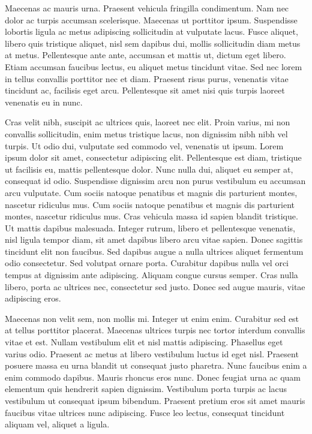 \documentclass[botnum,fleqn,final]{unmeethesis}
\begin{document}
Maecenas ac mauris urna. Praesent vehicula fringilla condimentum. Nam nec dolor
ac turpis accumsan scelerisque. Maecenas ut porttitor ipsum. Suspendisse
lobortis ligula ac metus adipiscing sollicitudin at vulputate lacus. Fusce
aliquet, libero quis tristique aliquet, nisl sem dapibus dui, mollis
sollicitudin diam metus at metus. Pellentesque ante ante, accumsan et mattis
ut, dictum eget libero. Etiam accumsan faucibus lectus, eu aliquet metus
tincidunt vitae. Sed nec lorem in tellus convallis porttitor nec et diam.
Praesent risus purus, venenatis vitae tincidunt ac, facilisis eget arcu.
Pellentesque sit amet nisi quis turpis laoreet venenatis eu in nunc.

Cras velit nibh, suscipit ac ultrices quis, laoreet nec elit. Proin varius, mi
non convallis sollicitudin, enim metus tristique lacus, non dignissim nibh nibh
vel turpis. Ut odio dui, vulputate sed commodo vel, venenatis ut ipsum. Lorem
ipsum dolor sit amet, consectetur adipiscing elit. Pellentesque est diam,
tristique ut facilisis eu, mattis pellentesque dolor. Nunc nulla dui, aliquet
eu semper at, consequat id odio. Suspendisse dignissim arcu non purus
vestibulum eu accumsan arcu vulputate. Cum sociis natoque penatibus et magnis
dis parturient montes, nascetur ridiculus mus. Cum sociis natoque penatibus et
magnis dis parturient montes, nascetur ridiculus mus. Cras vehicula massa id
sapien blandit tristique. Ut mattis dapibus malesuada. Integer rutrum, libero
et pellentesque venenatis, nisl ligula tempor diam, sit amet dapibus libero
arcu vitae sapien. Donec sagittis tincidunt elit non faucibus. Sed dapibus
augue a nulla ultrices aliquet fermentum odio consectetur. Sed volutpat ornare
porta. Curabitur dapibus nulla vel orci tempus at dignissim ante adipiscing.
Aliquam congue cursus semper. Cras nulla libero, porta ac ultrices nec,
consectetur sed justo. Donec sed augue mauris, vitae adipiscing eros.

Maecenas non velit sem, non mollis mi. Integer ut enim enim. Curabitur sed est
at tellus porttitor placerat. Maecenas ultrices turpis nec tortor interdum
convallis vitae et est. Nullam vestibulum elit et nisl mattis adipiscing.
Phasellus eget varius odio. Praesent ac metus at libero vestibulum luctus id
eget nisl. Praesent posuere massa eu urna blandit ut consequat justo pharetra.
Nunc faucibus enim a enim commodo dapibus. Mauris rhoncus eros nunc. Donec
feugiat urna ac quam elementum quis hendrerit sapien dignissim. Vestibulum
porta turpis ac lacus vestibulum ut consequat ipsum bibendum. Praesent pretium
eros sit amet mauris faucibus vitae ultrices nunc adipiscing. Fusce leo lectus,
consequat tincidunt aliquam vel, aliquet a ligula.
\end{document}
